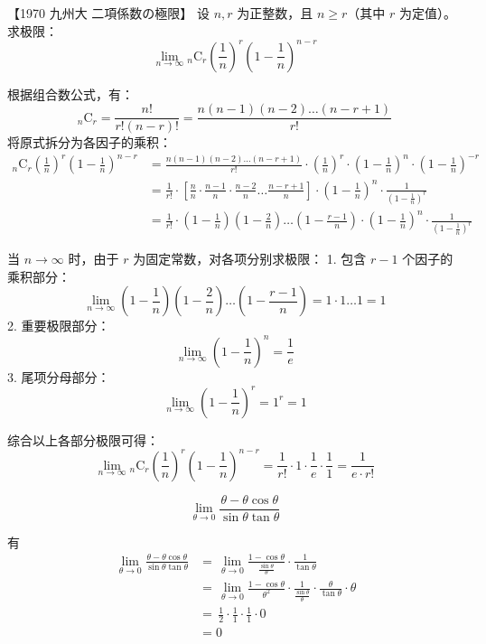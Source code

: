 \begin{questions}
    \question
【1970 九州大 二項係数の極限】
设 $n, r$ 为正整数，且 $n \ge r$（其中 $r$ 为定值）。求极限：
\[
\lim_{n \to \infty} {}_n\text{C}_r \left(\frac{1}{n}\right)^r \left(1 - \frac{1}{n}\right)^{n-r}
\]

\begin{solution}
根据组合数公式，有：
\[
{}_n\text{C}_r = \frac{n!}{r!(n-r)!} = \frac{n(n-1)(n-2)\dots(n-r+1)}{r!}
\]
将原式拆分为各因子的乘积：
\begin{align*}
{}_n\text{C}_r \left(\frac{1}{n}\right)^r \left(1 - \frac{1}{n}\right)^{n-r} &= \frac{n(n-1)(n-2)\dots(n-r+1)}{r!} \cdot \left(\frac{1}{n}\right)^r \cdot \left(1 - \frac{1}{n}\right)^n \cdot \left(1 - \frac{1}{n}\right)^{-r} \\
&= \frac{1}{r!} \cdot \left[ \frac{n}{n} \cdot \frac{n-1}{n} \cdot \frac{n-2}{n} \dots \frac{n-r+1}{n} \right] \cdot \left(1 - \frac{1}{n}\right)^n \cdot \frac{1}{\left(1 - \frac{1}{n}\right)^r} \\
&= \frac{1}{r!} \cdot \left(1 - \frac{1}{n}\right)\left(1 - \frac{2}{n}\right)\dots\left(1 - \frac{r-1}{n}\right) \cdot \left(1 - \frac{1}{n}\right)^n \cdot \frac{1}{\left(1 - \frac{1}{n}\right)^r}
\end{align*}

当 $n \to \infty$ 时，由于 $r$ 为固定常数，对各项分别求极限：
1. 包含 $r-1$ 个因子的乘积部分：
   \[
   \lim_{n \to \infty} \left(1 - \frac{1}{n}\right)\left(1 - \frac{2}{n}\right)\dots\left(1 - \frac{r-1}{n}\right) = 1 \cdot 1 \dots 1 = 1
   \]
2. 重要极限部分：
   \[
   \lim_{n \to \infty} \left(1 - \frac{1}{n}\right)^n = \frac{1}{e}
   \]
3. 尾项分母部分：
   \[
   \lim_{n \to \infty} \left(1 - \frac{1}{n}\right)^r = 1^r = 1
   \]

综合以上各部分极限可得：
\[
\lim_{n \to \infty} {}_n\text{C}_r \left(\frac{1}{n}\right)^r \left(1 - \frac{1}{n}\right)^{n-r} = \frac{1}{r!} \cdot 1 \cdot \frac{1}{e} \cdot \frac{1}{1} = \frac{1}{e \cdot r!}
\]
\end{solution}
    
    \question 
    \[
    \lim_{\theta \to 0} \frac{\theta - \theta \cos \theta}{\sin \theta \tan \theta}
    \]
    \begin{solution}
        有
        \begin{align*}
        \,\lim_{\theta \to 0} \frac{\theta - \theta \cos \theta}{\sin \theta \tan \theta} 
        &=\,\lim_{\theta \to 0} \frac{1 - \cos \theta}{\frac{\sin \theta}{\theta}} \cdot \frac{1}{\tan \theta} \\
        &=\,\lim_{\theta \to 0} \frac{1 - \cos \theta}{\theta^2}
        \cdot \frac{1}{\frac{\sin \theta}{\theta}} 
        \cdot \frac{\theta}{\tan \theta}
        \cdot \theta \\
        &=\,\frac{1}{2} \cdot \frac{1}{1} \cdot \frac{1}{1} \cdot 0 \\
        &= 0
        \end{align*}
    \end{solution}  


\end{questions}
